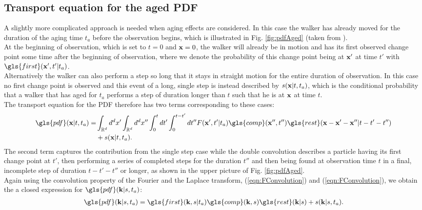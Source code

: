 \subsection{Transport equation for the aged PDF}

A slightly more complicated approach is needed when aging effects are considered. In this case the walker has already moved for the duration of the aging time $t_a$ before the observation begins, which is illustrated in Fig. \ref{fig:pdfAged} (taken from \cite{bothe}). \\
At the beginning of observation, which is set to $t=0$ and $\mathbf{ x }=0$, the walker will already be in motion and has its first observed change point some time after the beginning of observation, where we denote the probability of this change point being at $\mathbf{ x' }$ at time $t'$ with $\gls{first}(\ve{x}',t'|t_a)$. \\
Alternatively the walker can also perform a step so long that it stays in straight motion for the entire duration of observation. In this case  no first change point is observed and this event of a long, single step is instead described by $s(\mathbf{ x }|t,t_a)$, which is the conditional probability that a walker that has aged for $t_a$ performs a step of duration longer than $t$ such that he is at $\mathbf{ x }$ at time $t$. \\

The transport equation for the \gls{PDF} therefore has two terms corresponding to these cases:
%
\begin{align}
\gls{pdf}(\ve{x}|t,t_a) = &\int_{\mathbb{R}^d} d^{d}x' \int_{\mathbb{R}^d} d^{d}x'' \int_{0}^{t} dt' \int_{0}^{t-t'} d t''   F(\ve{x}',t'|t_a)  \gls{comp}(\ve{x}'',t'') \gls{rest}(\ve{x}-\ve{x}'-\ve{x}''| t-t'-t'') \nonumber \\
&+ s(\ve{x}|t,t_a).
\end{align}
%
The second term captures the contribution from the single step case while the double convolution describes a particle having its first change point at $t'$, then performing a series of completed steps for the duration $t''$ and then being found at observation time $t$ in a final, incomplete step of duration $t-t'-t''$ or longer, as shown in the upper picture of Fig. \ref{fig:pdfAged}.\\
Again using the convolution property of the Fourier and the Laplace transform,  (\ref{eqn:FConvolution}) and (\ref{eqn:FConvolution}), we obtain the a closed expression for $\gls{pdf}(\ve{k}|s,t_a)$:
%
\begin{align}
\gls{pdf}(\ve{k}|s,t_a) =  \gls{first}(\ve{k},s|t_a)  \gls{comp}(\ve{k},s) \gls{rest}(\ve{k}|s) + s(\ve{k}|s,t_a) \label{eqn:pdfAgedFourierLaplace}.
\end{align}


